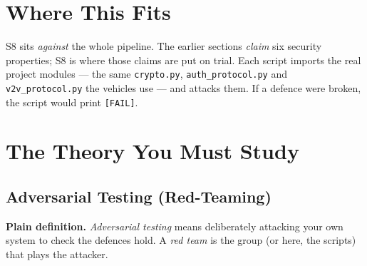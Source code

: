 \documentclass[11pt,a4paper]{article}
\begin{document}
\section{Where This Fits}

S8 sits \emph{against} the whole pipeline. The earlier sections \emph{claim}
six security properties; S8 is where those claims are put on trial. Each script
imports the real project modules --- the same \texttt{crypto.py},
\texttt{auth\_protocol.py} and \texttt{v2v\_protocol.py} the vehicles use --- and
attacks them. If a defence were broken, the script would print \texttt{[FAIL]}.

\begin{center}
\end{center}

\section{The Theory You Must Study}

\subsection{Adversarial Testing (Red-Teaming)}
\textbf{Plain definition.} \emph{Adversarial testing} means deliberately
attacking your own system to check the defences hold. A \emph{red team} is the
group (or here, the scripts) that plays the attacker.
\end{document}
